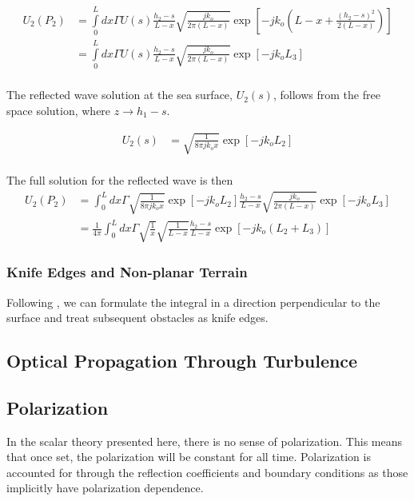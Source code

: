\begin{equation}
\begin{aligned}
U_2(P_2) &= \int\limits_{0}^{L}dx\Gamma U(s)\frac{h_2-s}{L-x}\sqrt{\frac{jk_o}{2\pi (L-x)}}\exp\left[-jk_o\left(L-x +\frac{(h_2-s)^2}{2(L-x)} \right) \right] \\
&= \int\limits_{0}^{L}dx\Gamma U(s)\frac{h_2-s}{L-x}\sqrt{\frac{jk_o}{2\pi (L-x)}}\exp\left[-jk_oL_3\right] \\
\end{aligned}
\label{gf_eq:56}
\end{equation}
\renewcommand{\baselinestretch}{2} \small\normalsize

The reflected wave solution at the sea surface, $U_2(s)$, follows from the free space solution, where $z \rightarrow h_1-s$.

\begin{equation}
\begin{aligned}
U_2(s) &= \sqrt{\frac{1}{8\pi jk_ox}}\exp\left[-jk_oL_2\right]\\
\end{aligned}
\label{gf_eq:57}
\end{equation}
\renewcommand{\baselinestretch}{2} \small\normalsize

\noindent The full solution for the reflected wave is then 
\begin{equation}
\begin{aligned}
U_2(P_2) &= \int_0^L dx \Gamma \sqrt{\frac{1}{8\pi j k_o x}}\exp[-jk_oL_2]\frac{h_2-s}{L-x}\sqrt{\frac{jk_o}{2\pi(L-x)}}\exp[-jk_oL_3]\\
&= \frac{1}{4\pi}\int_0^L dx \Gamma \sqrt{\frac{1}{x}}\sqrt{\frac{1}{L-x}}\frac{h_2-s}{L-x}\exp\left[-jk_o\left(L_2+L_3\right) \right]
\label{gf_eq:58}
\end{aligned}
\end{equation}
\renewcommand{\baselinestretch}{2} \small\normalsize

\subsubsection {Knife Edges and Non-planar Terrain}
Following \cite{whitteker_diffraction}, we can formulate the integral in a direction perpendicular to the surface and treat subsequent obstacles as knife edges.

\subsection {Optical Propagation Through Turbulence}

\subsection{Polarization}
In the scalar theory presented here, there is no sense of polarization. This means that once set, the polarization will be constant for all time. Polarization is accounted for through the reflection coefficients and boundary conditions as those implicitly have polarization dependence.
